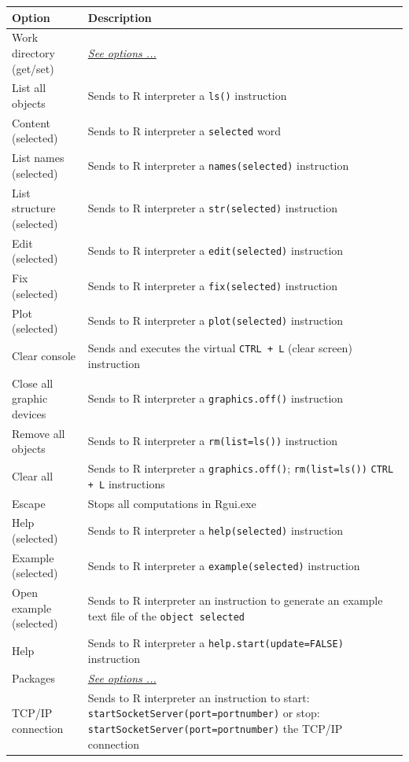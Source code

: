 \begin{scriptsize}
  \begin{tabularx}{\headwidth}{>{\hsize=0.4\hsize}X>{\hsize=0.7\hsize}X}\\
    \hline
    \textbf{Option} & \textbf{Description} \\
    \hline
    Work directory (get/set) &  \textit{\href{\#menu\_r\_control\_workdir}{See options ...}} \\
    \hdashline[1pt/1pt]
    List all objects & Sends to R interpreter a \texttt{ls()} instruction \\
    Content (selected) & Sends to R interpreter a \texttt{selected} word \\
    List names (selected) & Sends to R interpreter a \texttt{names(selected)} instruction \\
    List structure (selected) & Sends to R interpreter a \texttt{str(selected)} instruction \\
    Edit (selected) & Sends to R interpreter a \texttt{edit(selected)} instruction \\
    Fix (selected) & Sends to R interpreter a \texttt{fix(selected)} instruction \\
    Plot (selected) & Sends to R interpreter a \texttt{plot(selected)} instruction \\
    \hdashline[1pt/1pt]
    Clear console & Sends and executes the virtual \texttt{CTRL + L} (clear screen) instruction \\
    Close all graphic devices & Sends to R interpreter a \texttt{graphics.off()} instruction \\
    Remove all objects & Sends to R interpreter a \texttt{rm(list=ls())} instruction \\
    \hdashline[1pt/1pt]
    Clear all & Sends to R interpreter a \texttt{graphics.off()}; \texttt{rm(list=ls())}
     \texttt{CTRL + L} instructions \\
    \hdashline[1pt/1pt]
    Escape & Stops all computations in Rgui.exe \\
    \hdashline[1pt/1pt]
    Help (selected) & Sends to R interpreter a \texttt{help(selected)} instruction \\
    Example (selected) & Sends to R interpreter a \texttt{example(selected)} instruction \\
    Open example (selected) & Sends to R interpreter an instruction to generate an example
     text file of the \texttt{object selected}\\
    Help & Sends to R interpreter a \texttt{help.start(update=FALSE)} instruction \\
    \hdashline[1pt/1pt]
    Packages & \textit{\href{\#menu\_r\_control\_packages}{See options ...}} \\
    TCP/IP connection & Sends to R interpreter an instruction to start:
     \texttt{startSocketServer(port=portnumber)} or stop: \texttt{startSocketServer(port=portnumber)}
     the TCP/IP connection \\
    \hline
  \end{tabularx}
\end{scriptsize}

